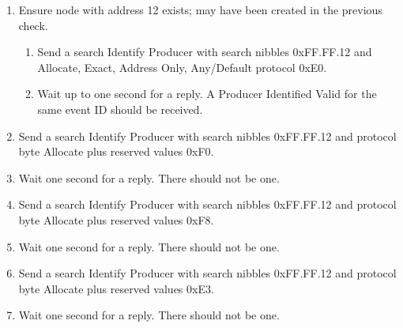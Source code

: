 \begin{enumerate}

\item Ensure node with address 12 exists; may have been created in the previous check.

    \begin{enumerate}
    \item Send a search Identify Producer with search nibbles 0xFF.FF.12 and 
        Allocate, Exact, Address Only, Any/Default protocol 0xE0.

    \item Wait up to one second for a reply.  A Producer Identified Valid for the same event ID
        should be received.
    \end{enumerate}

\item Send a search Identify Producer with search nibbles 0xFF.FF.12 and 
    protocol byte Allocate plus reserved values 0xF0.

\item Wait one second for a reply.  There should not be one.

\item Send a search Identify Producer with search nibbles 0xFF.FF.12 and 
    protocol byte Allocate plus reserved values 0xF8.

\item Wait one second for a reply.  There should not be one.

\item Send a search Identify Producer with search nibbles 0xFF.FF.12 and 
    protocol byte Allocate plus reserved values 0xE3.

\item Wait one second for a reply.  There should not be one.

\end{enumerate}

  
